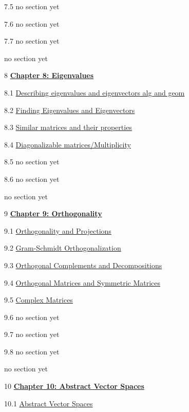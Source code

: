 \documentclass{ximera}
\begin{document}
7.5	no section yet
	
7.6	no section yet
	
7.7	no section yet
	
	no section yet
	
8	\href{https://ximera.osu.edu/oerlinalg/LinearAlgebra/XLAChapter_eigenvalues/main}{\textbf{Chapter 8: Eigenvalues}}
	
8.1	\href{https://ximera.osu.edu/oerlinalg/LinearAlgebra/EIG-0010/main}{Describing eigenvalues and eigenvectors alg and geom}
	
8.2	\href{https://ximera.osu.edu/oerlinalg/LinearAlgebra/EIG-0020/main}{Finding Eigenvalues and Eigenvectors}
	
8.3	\href{https://ximera.osu.edu/oerlinalg/LinearAlgebra/EIG-0040/main}{Similar matrices and their properties}
	
8.4	\href{https://ximera.osu.edu/oerlinalg/LinearAlgebra/EIG-0050/main}{Diagonalizable matrices/Multiplicity}
	
8.5	no section yet
	
8.6	no section yet
	
	no section yet
	
9	\href{https://ximera.osu.edu/oerlinalg/LinearAlgebra/XLAChapter_orthogonality/main}{\textbf{Chapter 9: Orthogonality}}
	
9.1	\href{https://ximera.osu.edu/oerlinalg/LinearAlgebra/RTH-0010/main}{Orthogonality and Projections}
	
9.2	\href{https://ximera.osu.edu/oerlinalg/LinearAlgebra/RTH-0015/main}{Gram-Schmidt Orthogonalization}
	
9.3	\href{https://ximera.osu.edu/oerlinalg/LinearAlgebra/RTH-0020/main}{Orthogonal Complements and Decompositions}
	
9.4	\href{https://ximera.osu.edu/oerlinalg/LinearAlgebra/RTH-0035/main}{Orthogonal Matrices and Symmetric Matrices}
	
9.5	\href{https://ximera.osu.edu/oerlinalg/LinearAlgebra/RTH-0050/main}{Complex Matrices}
	
9.6	no section yet
	
9.7	no section yet
	
9.8	no section yet
	
	no section yet
	
10	\href{https://ximera.osu.edu/oerlinalg/LinearAlgebra/XLAChapter_vecSpaces/main}{\textbf{Chapter 10: Abstract Vector Spaces}}
	
10.1	\href{https://ximera.osu.edu/oerlinalg/LinearAlgebra/VSP-0050/main}{Abstract Vector Spaces}
	
\end{document}
